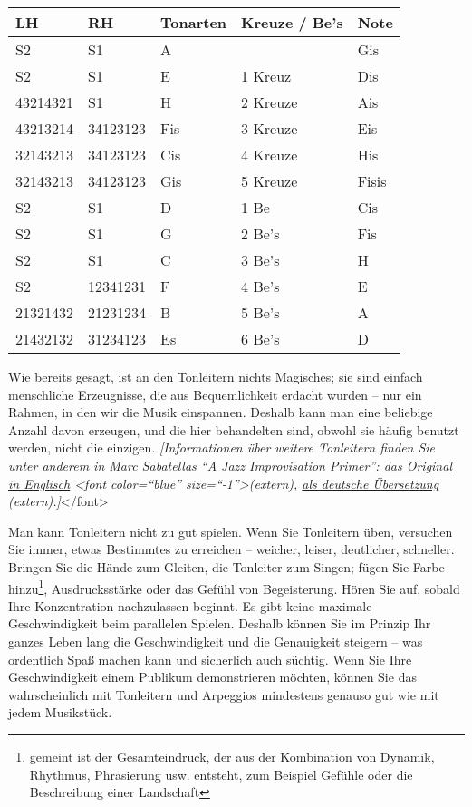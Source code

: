 \begin{tabular}{l|l|l|l|l}
 LH & RH & Tonarten & Kreuze / Be's & Note \\ 
 \hline
 S2 & S1 & A &   & Gis \\ 
 S2 & S1 & E & 1 Kreuz & Dis \\ 
 43214321 & S1 & H & 2 Kreuze & Ais \\ 
 43213214 & 34123123 & Fis & 3 Kreuze & Eis \\ 
 32143213 & 34123123 & Cis & 4 Kreuze & His \\ 
 32143213 & 34123123 & Gis & 5 Kreuze & Fisis \\ 
 S2 & S1 & D & 1 Be & Cis \\ 
 S2 & S1 & G & 2 Be's & Fis \\ 
 S2 & S1 & C & 3 Be's & H \\ 
 S2 & 12341231 & F & 4 Be's & E \\ 
 21321432 & 21231234 & B & 5 Be's & A \\ 
 21432132 & 31234123 & Es & 6 Be's & D \\ 
\end{tabular}

Wie bereits gesagt, ist an den Tonleitern nichts Magisches; sie sind einfach menschliche Erzeugnisse, die aus Bequemlichkeit erdacht wurden -- nur ein Rahmen, in den wir die Musik einspannen.
Deshalb kann man eine beliebige Anzahl davon erzeugen, und die hier behandelten sind, obwohl sie häufig benutzt werden, nicht die einzigen.
\textit{[Informationen über weitere Tonleitern finden Sie unter anderem in Marc Sabatellas \enquote{A Jazz Improvisation Primer}: \hyperref[http://www.outsideshore.com/primer/primer/index.html]{das Original in Englisch} <font color=\enquote{blue} size=\enquote{-1}>(extern), \hyperref[http://msjipde.uteedgar-lins.de/index.html]{als deutsche Übersetzung} (extern).]}</font>

Man kann Tonleitern nicht zu gut spielen.
Wenn Sie Tonleitern üben, versuchen Sie immer, etwas Bestimmtes zu erreichen -- weicher, leiser, deutlicher, schneller.
Bringen Sie die Hände zum Gleiten, die Tonleiter zum Singen; fügen Sie Farbe hinzu\footnote{gemeint ist der Gesamteindruck, der aus der Kombination von Dynamik, Rhythmus, Phrasierung usw. entsteht, zum Beispiel Gefühle oder die Beschreibung einer Landschaft}, Ausdrucksstärke oder das Gefühl von  Begeisterung.
Hören Sie auf, sobald Ihre Konzentration nachzulassen beginnt.
Es gibt keine maximale Geschwindigkeit beim parallelen Spielen.
Deshalb können Sie im Prinzip Ihr ganzes Leben lang die Geschwindigkeit und die Genauigkeit steigern -- was ordentlich Spaß machen kann und sicherlich auch süchtig.
Wenn Sie Ihre Geschwindigkeit einem Publikum demonstrieren möchten, können Sie das wahrscheinlich mit Tonleitern und Arpeggios mindestens genauso gut wie mit jedem Musikstück.



